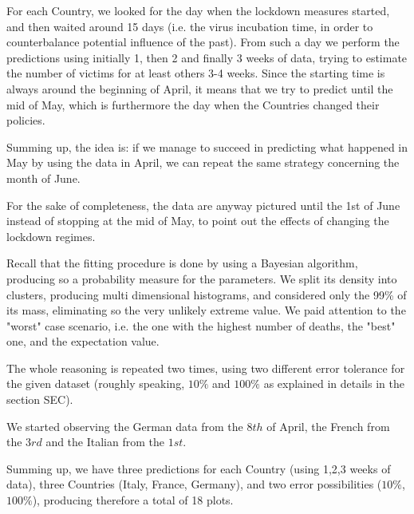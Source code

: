 \documentclass[8pt]{article}
\begin{document}
For each Country, we looked for the day when the lockdown measures
started, and then waited around 15 days (i.e. the virus
incubation time, in order to counterbalance potential influence of the
past). 
From such a day we perform the predictions 
using initially 1, then 2 and finally 3 weeks of data,
trying to estimate the number of victims for at least others 3-4 weeks. 
Since the starting time is always around the
beginning of April, it means that 
we try to predict until the mid
of May, which is furthermore the day when the Countries changed their
policies.


Summing up, the idea is:
if we manage to succeed in predicting
what happened in May by using the data in April, we can repeat the same
strategy concerning the month of June. 


For the sake of completeness, the 
data are anyway pictured until the 1st of June instead of stopping at
the mid of May, to point out the effects of changing the lockdown regimes.


Recall that the fitting procedure is done by using a Bayesian algorithm,
producing so a probability measure for the parameters. We split its density
into clusters, producing multi dimensional histograms, and considered
only the 99\% of its mass, eliminating so the very
unlikely extreme value. We paid attention to
the "worst" case scenario, i.e. the one with the highest number of deaths, 
the "best" one, and the expectation value.


The whole reasoning is repeated two times, using two different error
tolerance for the given dataset (roughly speaking, $10\%$ and $100\%$
as explained in details in the section SEC).


We started observing the German data from the $8th$ of April,
the French from the $3rd$ and the Italian from the $1st$. 


Summing up, we have three predictions for each Country (using 
1,2,3 weeks of data), 
three Countries (Italy, France, Germany), and two error
possibilities ($10\%$, $100\%$), producing therefore a total of 18 plots.
\end{document}
